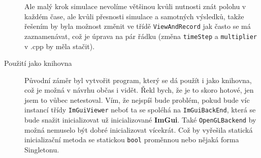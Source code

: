 \begin{description}
	Ale malý krok simulace nevolíme většinou kvůli nutnosti znát polohu v každém čase, ale kvůli přesnosti simulace a samotných výsledků, takže řešením by byla možnost změnit ve třídě \texttt{ViewAndRecord} jak často se má zaznamenávat, což je úprava na pár řádku (změna \texttt{timeStep} a \texttt{multiplier} v .cpp by měla stačit).
	
	\item[Použití jako knihovna] Původní záměr byl vytvořit program, který se dá použít i jako knihovna, což je možná v návrhu občas i vidět. Řekl bych, že je to skoro hotové, jen jsem to vůbec netestoval. Vím, že nejspíš bude problém, pokud bude víc instancí třídy \texttt{ImGuiViewer} neboť ta se spoléhá na \texttt{ImGuiBackEnd}, která se bude snažit inicializovat už inicializované \textbf{ImGui}. Také \texttt{OpenGLBackend} by možná nemuselo být dobré inicializovat vícekrát. Což by vyřešila statická inicializační metoda se statickou \texttt{bool} proměnnou nebo nějaká forma Singletonu. 
	
	
\end{description}
